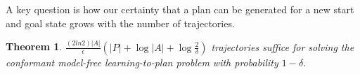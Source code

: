 \documentclass[letterpaper]{article}
\newenvironment{proof}{\noindent{\bf Proof:~~}}{\qed}
\newcommand{\qed}{\hfill\ensuremath{\blacksquare}}
\newtheorem{theorem}{Theorem}
\newcommand{\MEMO}[1]
{ \fbox{
\begin{minipage}[b]{7.9 cm}
#1
\end{minipage}
} }
\begin{document}
A key question is how our certainty that a plan can be generated for a new start and goal state grows with the number of trajectories. 
\begin{theorem}
$\frac{(2ln 2)|A|}{\epsilon}(|P|+\log |A|+\log\frac{2}{\delta})$ trajectories suffice for solving the conformant model-free learning-to-plan problem
with probability $1-\delta$. 
\end{theorem}
\end{document}
